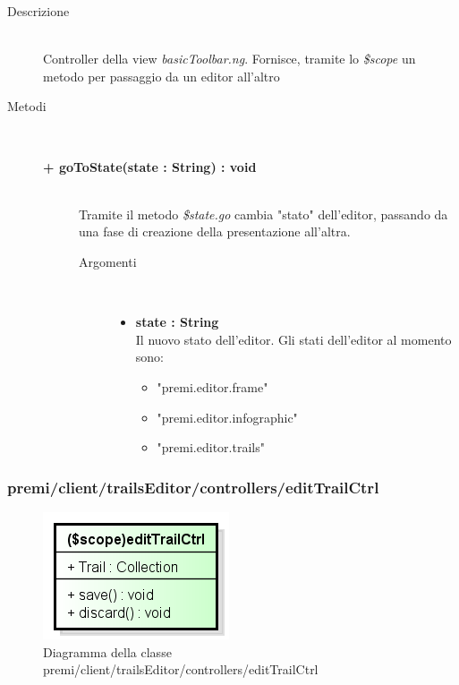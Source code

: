 \begin{description}
\item[Descrizione] \hfill \\
	Controller della view \textit{basicToolbar.ng}. Fornisce, tramite lo \textit{\$scope} un metodo per passaggio da un editor all'altro
	
\item[Metodi] \hfill \\

	\begin{description}
		\item[\textbf{\color{blue}+ goToState(state : String) : void			}] \hfill \\
			Tramite il metodo \textit{\$state.go} cambia "stato" dell'editor, passando da una fase di creazione della presentazione all'altra.
			
		\begin{description}
			\item[Argomenti] \hfill \\
				\begin{itemize}
				
					\item \textbf{state : String			} \hfill \\
					Il nuovo stato dell'editor. Gli stati dell'editor al momento sono:
					\begin{itemize}
						\item "premi.editor.frame"
						\item "premi.editor.infographic"
						\item "premi.editor.trails"
					\end{itemize}
					
				\end{itemize}
		\end{description}
	\end{description}
		
\end{description}



\subsubsection{premi/client/trailsEditor/controllers/editTrailCtrl}
\begin{figure}[h]
\begin{center}
\includegraphics[scale=0.55]{img/diacla/editTrailCtrl.png}
\caption{Diagramma della classe premi/client/trailsEditor/controllers/editTrailCtrl}
\end{center}
\end{figure}


